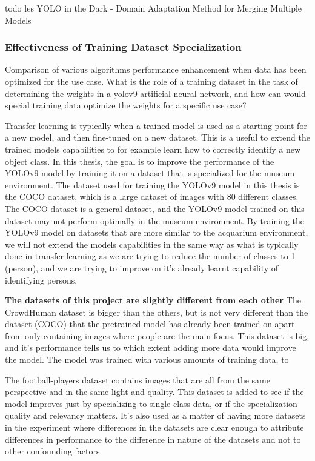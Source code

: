 todo les YOLO in the Dark - Domain Adaptation Method for Merging Multiple Models

\subsubsection{Effectiveness of Training Dataset Specialization}
\label{sec:dataset_specialization}
Comparison of various algorithms performance enhancement when data has been optimized for the use case. What is the role of a training dataset in the task of determining the weights in a yolov9 artificial neural network, and how can would special training data optimize the weights for a specific use case?

Transfer learning is typically when a trained model is used as a starting point for a new model, and then fine-tuned on a new dataset. This is a useful to extend the trained models capabilities to for example learn how to correctly identify a new object class. In this thesis, the goal is to improve the performance of the YOLOv9 model by training it on a dataset that is specialized for the museum environment. The dataset used for training the YOLOv9 model in this thesis is the COCO dataset, which is a large dataset of images with 80 different classes. The COCO dataset is a general dataset, and the YOLOv9 model trained on this dataset may not perform optimally in the museum environment. By training the YOLOv9 model on datasets that are more similar to the acquarium environment, we will not extend the models capabilities in the same way as what is typically done in transfer learning as we are trying to reduce the number of classes to 1 (person), and we are trying to improve on it's already learnt capability of identifying persons.

\textbf{The datasets of this project are slightly different from each other}
The CrowdHuman dataset is bigger than the others, but is not very different than the dataset (COCO) that the pretrained model has already been trained on apart from only containing images where people are the main focus. This dataset is big, and it's performance tells us to which extent adding more data would improve the model. The model was trained with various amounts of training data, to

The football-players dataset contains images that are all from the same perspective and in the same light and quality. This dataset is added to see if the model improves just by specializing to single class data, or if the specialization quality and relevancy matters. It's also used as a matter of having more datasets in the experiment where differences in the datasets are clear enough to attribute differences in performance to the difference in nature of the datasets and not to other confounding factors.

